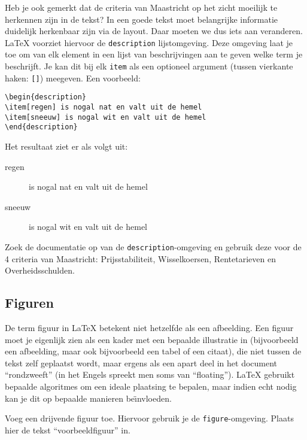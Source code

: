 \documentclass[12pt, dutch]{article}
\begin{document}
Heb je ook gemerkt dat de criteria van Maastricht op het zicht
moeilijk te herkennen zijn in de tekst? In een goede tekst moet
belangrijke informatie duidelijk herkenbaar zijn via de layout. Daar
moeten we dus iets aan veranderen. \LaTeX{} voorziet hiervoor de
\texttt{description} lijstomgeving. Deze omgeving laat je toe om van
elk element in een lijst van beschrijvingen aan te geven welke term je
beschrijft. Je kan dit bij elk \texttt{item} als een optioneel argument
(tussen vierkante haken: \texttt{[]}) meegeven. Een voorbeeld:
\begin{verbatim}
\begin{description}
\item[regen] is nogal nat en valt uit de hemel
\item[sneeuw] is nogal wit en valt uit de hemel
\end{description}
\end{verbatim}

Het resultaat ziet er als volgt uit:
\begin{description}
  \item[regen] is nogal nat en valt uit de hemel
  \item[sneeuw] is nogal wit en valt uit de hemel
\end{description}

\begin{tcolorbox}[title=Opgave 5c]
  Zoek de documentatie op van de \texttt{description}-omgeving en
  gebruik deze voor de 4 criteria van Maastricht: Prijsstabiliteit,
  Wisselkoersen, Rentetarieven en Overheidsschulden.
\end{tcolorbox}

\subsection{Figuren}

De term figuur in \LaTeX{} betekent niet hetzelfde als een afbeelding.
Een figuur moet je eigenlijk zien als een kader met een bepaalde
illustratie in (bijvoorbeeld een afbeelding, maar ook bijvoorbeeld een
tabel of een citaat), die niet tussen de tekst zelf geplaatst wordt,
maar ergens als een apart deel in het document ``rondzweeft'' (in het
Engels spreekt men soms van ``floating''). \LaTeX{} gebruikt bepaalde
algoritmes om een ideale plaatsing te bepalen, maar indien echt nodig
kan je dit op bepaalde manieren be\"{\i}nvloeden.

\begin{tcolorbox}[title=Opgave 5d]
  Voeg een drijvende figuur toe. Hiervoor gebruik je de
  \texttt{figure}-omgeving. Plaats hier de tekst ``voorbeeldfiguur'' in.
\end{tcolorbox}
\end{document}
